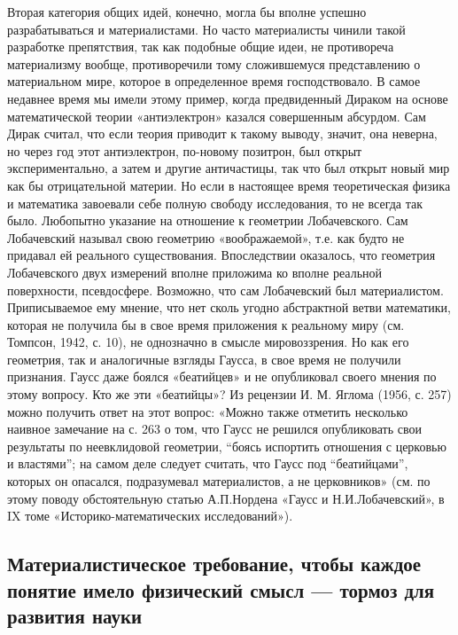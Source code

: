 Вторая  категория  общих  идей,   конечно,  могла  бы  вполне  успешно
разрабатываться и  материалистами. Но часто материалисты  чинили такой
разработке препятствия,  так как  подобные общие идеи,  не противореча
материализму вообще,  противоречили тому сложившемуся  представлению о
материальном  мире, которое  в  определенное  время господствовало.  В
самое недавнее время мы имели этому пример, когда предвиденный Дираком
на  основе математической  теории  «антиэлектрон» казался  совершенным
абсурдом. Сам Дирак считал, что  если теория приводит к такому выводу,
значит,  она  неверна,  но  через  год  этот  антиэлектрон,  по-новому
позитрон, был  открыт экспериментально, а затем  и другие античастицы,
так что был  открыт новый мир как бы отрицательной  материи. Но если в
настоящее  время  теоретическая  физика и  математика  завоевали  себе
полную свободу исследования, то не всегда так было. Любопытно указание
на отношение  к геометрии  Лобачевского. Сам Лобачевский  называл свою
геометрию  «воображаемой», т.е.  как  будто не  придавал ей  реального
существования.  Впоследствии  оказалось,  что  геометрия  Лобачевского
двух  измерений  вполне  приложима  ко  вполне  реальной  поверхности,
псевдосфере.   Возможно,  что   сам  Лобачевский   был  материалистом.
Приписываемое  ему  мнение, что  нет  сколь  угодно абстрактной  ветви
математики, которая не получила бы в свое время приложения к реальному
миру (см. Томпсон, 1942, с. 10), не однозначно в смысле мировоззрения.
Но как его  геометрия, так и аналогичные взгляды Гаусса,  в свое время
не получили признания. Гаусс даже  боялся «беатийцев» и не опубликовал
своего мнения по этому вопросу. Кто  же эти «беатийцы»? Из рецензии И.
М. Яглома (1956,  с. 257) можно получить ответ на  этот вопрос: «Можно
также отметить несколько наивное замечание на  с. 263 о том, что Гаусс
не  решился опубликовать  свои результаты  по неевклидовой  геометрии,
``боясь испортить  отношения с  церковью и  властями''; на  самом деле
следует считать,  что Гаусс  под ``беатийцами'', которых  он опасался,
подразумевал  материалистов, а  не церковников»  (см. по  этому поводу
обстоятельную статью А.П.Нордена «Гаусс  и Н.И.Лобачевский», в IX томе
«Историко-математических исследований»).

\subsection{Материалистическое требование, чтобы  каждое понятие имело
физический смысл --- тормоз для развития науки}


